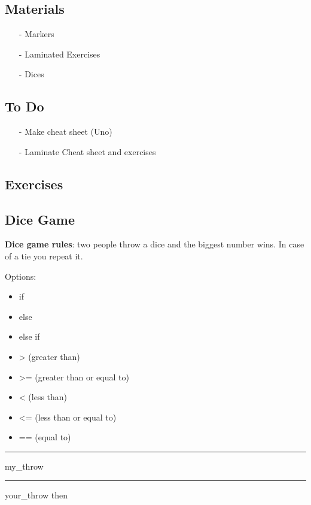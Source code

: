 \subsection*{Materials}

\begin{itemize}
    \item[-] Markers
    \item[-] Laminated Exercises
    \item[-] Dices
\end{itemize}

\subsection*{To Do}
\begin{itemize}
    \item[-] Make cheat sheet (Uno)
    \item[-] Laminate Cheat sheet and exercises
\end{itemize}


\subsection*{Exercises}

\subsection*{Dice Game}

\textbf{Dice game rules}: two people throw a dice and the biggest number wins. In case of a tie you repeat it. 



Options:

\begin{itemize}
\color{red}
\item if
\item else 
\item else if
\end{itemize}

\begin{itemize}
\color{CornflowerBlue}
\item > (greater than)
\item >= (greater than or equal to)
\item < (less than)
\item <= (less than or equal to)
\item == (equal to)
\end{itemize}

\vspace{1cm}
\textcolor{red}{\rule[-0.5ex]{0.7cm}{1pt}} my\_throw \textcolor{CornflowerBlue}{\rule[-0.5ex]{0.7cm}{1pt}} your\_throw then


